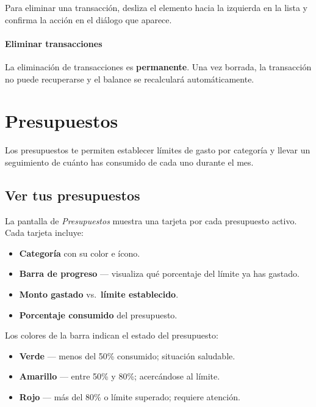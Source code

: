 \documentclass[a4paper,12pt]{report}
\newcommand{\pantalla}[1]{\textit{\textcolor{gristexto}{#1}}}
\begin{document}
Para eliminar una transacción, desliza el elemento hacia la izquierda en
la lista y confirma la acción en el diálogo que aparece.

\subsubsection*{Eliminar transacciones}

La eliminación de transacciones es \textbf{permanente}. Una vez borrada,
la transacción no puede recuperarse y el balance se recalculará
automáticamente.


\chapter{Presupuestos}

Los presupuestos te permiten establecer límites de gasto por categoría y
llevar un seguimiento de cuánto has consumido de cada uno durante el mes.

\section{Ver tus presupuestos}

La pantalla de \pantalla{Presupuestos} muestra una tarjeta por cada
presupuesto activo. Cada tarjeta incluye:

\begin{itemize}
  \item \textbf{Categoría} con su color e ícono.
  \item \textbf{Barra de progreso} — visualiza qué porcentaje del límite
        ya has gastado.
  \item \textbf{Monto gastado} vs.\ \textbf{límite establecido}.
  \item \textbf{Porcentaje consumido} del presupuesto.
\end{itemize}

Los colores de la barra indican el estado del presupuesto:
\begin{itemize}
  \item \textcolor{verdefinara}{\textbf{Verde}} — menos del 50\%
        consumido; situación saludable.
  \item \textcolor{amarilloaviso}{\textbf{Amarillo}} — entre 50\% y 80\%;
        acercándose al límite.
  \item \textcolor{rojofinara}{\textbf{Rojo}} — más del 80\% o límite
        superado; requiere atención.
\end{itemize}
\end{document}

